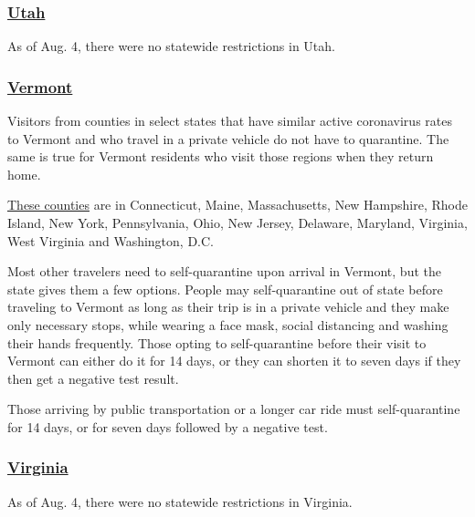 \hypertarget{utah}{%
\subsubsection{\texorpdfstring{\href{https://www.visitutah.com/plan-your-trip/covid-19/}{Utah}}{Utah}}\label{utah}}

As of Aug. 4, there were no statewide restrictions in Utah.

\hypertarget{vermont}{%
\subsubsection{\texorpdfstring{\href{https://www.healthvermont.gov/response/coronavirus-covid-19/traveling-vermont}{Vermont}}{Vermont}}\label{vermont}}

Visitors from counties in select states that have similar active
coronavirus rates to Vermont and who travel in a private vehicle do not
have to quarantine. The same is true for Vermont residents who visit
those regions when they return home.

\href{https://accd.vermont.gov/covid-19/restart/cross-state-travel}{These
counties} are in Connecticut, Maine, Massachusetts, New Hampshire, Rhode
Island, New York, Pennsylvania, Ohio, New Jersey, Delaware, Maryland,
Virginia, West Virginia and Washington, D.C.

Most other travelers need to self-quarantine upon arrival in Vermont,
but the state gives them a few options. People may self-quarantine out
of state before traveling to Vermont as long as their trip is in a
private vehicle and they make only necessary stops, while wearing a face
mask, social distancing and washing their hands frequently. Those opting
to self-quarantine before their visit to Vermont can either do it for 14
days, or they can shorten it to seven days if they then get a negative
test result.

Those arriving by public transportation or a longer car ride must
self-quarantine for 14 days, or for seven days followed by a negative
test.

\hypertarget{virginia}{%
\subsubsection{\texorpdfstring{\href{https://www.vdh.virginia.gov/coronavirus/frequently-asked-questions/u-s-travelers/}{Virginia}}{Virginia}}\label{virginia}}

As of Aug. 4, there were no statewide restrictions in Virginia.

